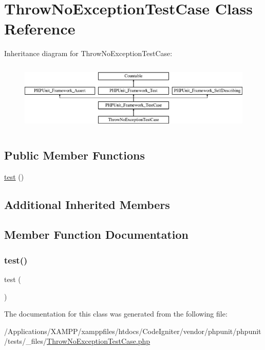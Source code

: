 \hypertarget{class_throw_no_exception_test_case}{}\section{Throw\+No\+Exception\+Test\+Case Class Reference}
\label{class_throw_no_exception_test_case}
Inheritance diagram for Throw\+No\+Exception\+Test\+Case\+:\begin{figure}[H]
\begin{center}
\leavevmode
\includegraphics[height=3.303835cm]{class_throw_no_exception_test_case}
\end{center}
\end{figure}
\subsection*{Public Member Functions}
\begin{DoxyCompactItemize}
\item 
\mbox{\hyperlink{class_throw_no_exception_test_case_ad69dd4607977cae05ebe19d1ae604fb1}{test}} ()
\end{DoxyCompactItemize}
\subsection*{Additional Inherited Members}


\subsection{Member Function Documentation}
\mbox{\label{class_throw_no_exception_test_case_ad69dd4607977cae05ebe19d1ae604fb1}} 
\subsubsection{\texorpdfstring{test()}{test()}}
{\footnotesize\ttfamily test (\begin{DoxyParamCaption}{ }\end{DoxyParamCaption})}



The documentation for this class was generated from the following file\+:\begin{DoxyCompactItemize}
\item 
/\+Applications/\+X\+A\+M\+P\+P/xamppfiles/htdocs/\+Code\+Igniter/vendor/phpunit/phpunit/tests/\+\_\+files/\mbox{\hyperlink{_throw_no_exception_test_case_8php}{Throw\+No\+Exception\+Test\+Case.\+php}}\end{DoxyCompactItemize}
